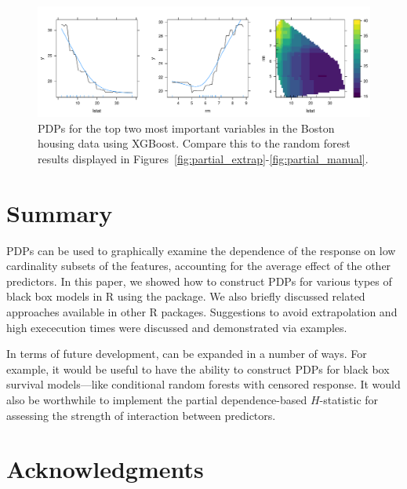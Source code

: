 \begin{figure}[!htbp]
  \centering
  \includegraphics[width=1.0\linewidth]{boston_xgb}
  \caption{PDPs for the top two most important variables in the Boston housing data using XGBoost. Compare this to the random forest results displayed in Figures~\ref{fig:partial_extrap}-\ref{fig:partial_manual}.}
  \label{fig:boston_xgb}
\end{figure}


\section{Summary}

PDPs can be used to graphically examine the dependence of the response on low cardinality subsets of the features, accounting for the average effect of the other predictors. In this paper, we showed how to construct PDPs for various types of black box models in R using the  package. We also briefly discussed related approaches available in other R packages. Suggestions to avoid extrapolation and high exececution times were discussed and demonstrated via examples.

In terms of future development,  can be expanded in a number of ways. For example, it would be useful to have the ability to construct PDPs for black box survival models---like conditional random forests with censored response. It would also be worthwhile to implement the partial dependence-based $H$-statistic \citep{friedman-2008-predictive} for assessing the strength of interaction between predictors.


\section{Acknowledgments}

